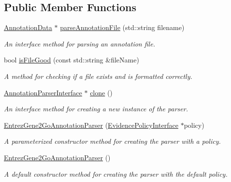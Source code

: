 \subsection*{Public Member Functions}
\begin{DoxyCompactItemize}
\item 
\hyperlink{classAnnotationData}{Annotation\+Data} $\ast$ \hyperlink{classEntrezGene2GoAnnotationParser_aca2333f3cc25595c1283c3b290dd45cf}{parse\+Annotation\+File} (std\+::string filename)
\begin{DoxyCompactList}\small\item\em An interface method for parsing an annotation file. \end{DoxyCompactList}\item 
bool \hyperlink{classEntrezGene2GoAnnotationParser_a5e418ff06c4e2619c0723b828a8578cd}{is\+File\+Good} (const std\+::string \&file\+Name)
\begin{DoxyCompactList}\small\item\em A method for checking if a file exists and is formatted correctly. \end{DoxyCompactList}\item 
\hyperlink{classAnnotationParserInterface}{Annotation\+Parser\+Interface} $\ast$ \hyperlink{classEntrezGene2GoAnnotationParser_a56aaa3a03354c6894fed75accfa2637b}{clone} ()
\begin{DoxyCompactList}\small\item\em An interface method for creating a new instance of the parser. \end{DoxyCompactList}\item 
\hyperlink{classEntrezGene2GoAnnotationParser_ad9fad52a10bd767ff769ee4d953bda3d}{Entrez\+Gene2\+Go\+Annotation\+Parser} (\hyperlink{classEvidencePolicyInterface}{Evidence\+Policy\+Interface} $\ast$policy)
\begin{DoxyCompactList}\small\item\em A parameterized constructor method for creating the parser with a policy. \end{DoxyCompactList}\item 
\hyperlink{classEntrezGene2GoAnnotationParser_a50b77b0894f628df64ab3104a99e7f3c}{Entrez\+Gene2\+Go\+Annotation\+Parser} ()
\begin{DoxyCompactList}\small\item\em A default constructor method for creating the parser with the default policy. \end{DoxyCompactList}\end{DoxyCompactItemize}


